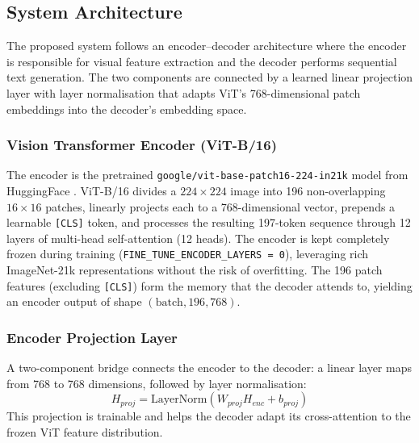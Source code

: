 \documentclass[conference]{IEEEtran}
\begin{document}
\subsection{System Architecture}
The proposed system follows an encoder--decoder architecture where the encoder is responsible for visual feature extraction and the decoder performs sequential text generation. The two components are connected by a learned linear projection layer with layer normalisation that adapts ViT's 768-dimensional patch embeddings into the decoder's embedding space.

\subsubsection{Vision Transformer Encoder (ViT-B/16)}
The encoder is the pretrained \texttt{google/vit-base-patch16-224-in21k} model from HuggingFace \cite{dosovitskiy2020image}. ViT-B/16 divides a $224 \times 224$ image into 196 non-overlapping $16 \times 16$ patches, linearly projects each to a 768-dimensional vector, prepends a learnable \texttt{[CLS]} token, and processes the resulting 197-token sequence through 12 layers of multi-head self-attention (12 heads). The encoder is kept completely frozen during training (\texttt{FINE\_TUNE\_ENCODER\_LAYERS = 0}), leveraging rich ImageNet-21k representations without the risk of overfitting. The 196 patch features (excluding \texttt{[CLS]}) form the memory that the decoder attends to, yielding an encoder output of shape $(\text{batch}, 196, 768)$.

\subsubsection{Encoder Projection Layer}
A two-component bridge connects the encoder to the decoder: a linear layer maps from 768 to 768 dimensions, followed by layer normalisation:
\begin{equation}
    H_{proj} = \text{LayerNorm}(W_{proj} H_{enc} + b_{proj})
\end{equation}
This projection is trainable and helps the decoder adapt its cross-attention to the frozen ViT feature distribution.
\end{document}
